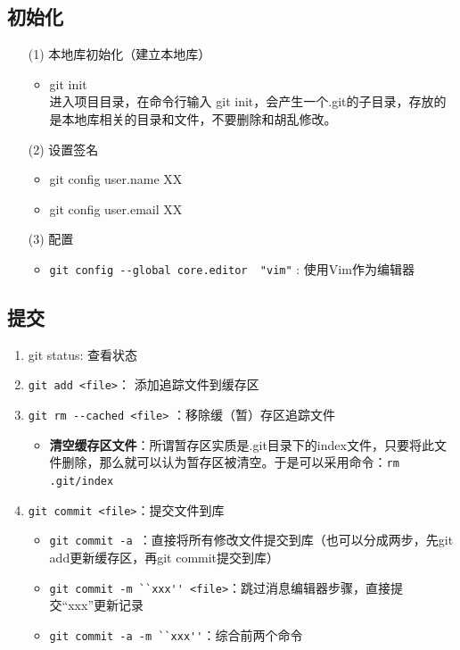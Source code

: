 \subsection{初始化}
\begin{itemize}
\item[(1)] 本地库初始化（建立本地库）
\begin{itemize}
\item git init\\
进入项目目录，在命令行输入 git init，会产生一个.git的子目录，存放的是本地库相关的目录和文件，不要删除和胡乱修改。
\end{itemize}

\item[(2)] 设置签名
\begin{itemize}
\item git config user.name XX
\item git config user.email XX
\end{itemize}

\item [(3)] 配置
\begin{itemize}
\item \verb|git config --global core.editor  "vim"| : 使用Vim作为编辑器
\end{itemize}

\end{itemize}



\subsection{提交}
\begin{enumerate}
\item git status: 查看状态
\item \verb|git add <file>|： 添加追踪文件到缓存区 
\item  \verb|git rm --cached <file>| ：移除缓（暂）存区追踪文件
\begin{itemize}
\item \textbf{清空缓存区文件}：所谓暂存区实质是.git目录下的index文件，只要将此文件删除，那么就可以认为暂存区被清空。于是可以采用命令：\verb|rm .git/index|
\end{itemize}
\item \verb|git commit <file>|：提交文件到库
\begin{itemize}
\item \verb|git commit -a |：直接将所有修改文件提交到库（也可以分成两步，先git add更新缓存区，再git commit提交到库）
\item \verb|git commit -m ``xxx'' <file>|：跳过消息编辑器步骤，直接提交“xxx”更新记录
\item \verb|git commit -a -m ``xxx''|：综合前两个命令
\end{itemize}
\end{enumerate}



